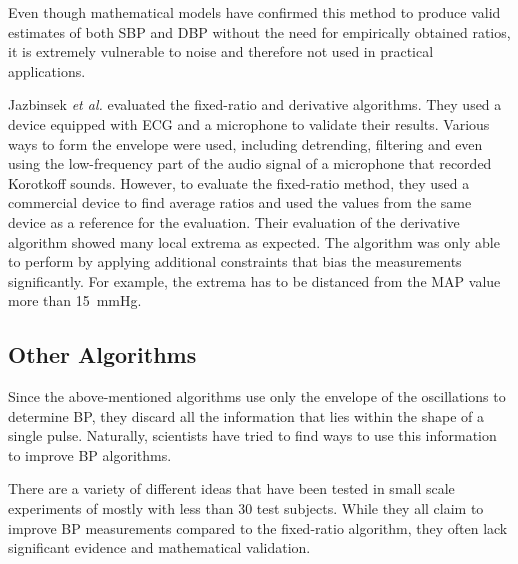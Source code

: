 Even though mathematical models have confirmed this method to produce valid estimates of both SBP and DBP without the need for empirically obtained ratios, it is extremely vulnerable to noise and therefore not used in practical applications.  \cite{Babbs2012,Chandrasekhar2019}

Jazbinsek \textit{et al.} evaluated the fixed-ratio and derivative algorithms. They used a device equipped with ECG and a microphone to validate their results. Various ways to form the envelope were used, including detrending, filtering and even using the low-frequency part of the audio signal of a microphone that recorded Korotkoff sounds. However, to evaluate the fixed-ratio method, they used a commercial device to find average ratios and used the values from the same device as a reference for the evaluation. Their evaluation of the derivative algorithm showed many local extrema as expected. The algorithm was only able to perform by applying additional constraints that bias the measurements significantly. For example, the extrema has to be distanced from the MAP value more than \SI{15}{\mmHg}. \cite{Jazbinsek2010,Jazbinsek2005,Jazbinsek2016}


\subsection{Other Algorithms}
Since the above-mentioned algorithms use only the envelope of the oscillations to determine BP, they discard all the information that lies within the shape of a single pulse. Naturally, scientists have tried to find ways to use this information to improve BP algorithms.

There are a variety of different ideas that have been tested in small scale experiments of mostly with less than 30 test subjects. While they all claim to improve BP measurements compared to the fixed-ratio algorithm, they often lack significant evidence and mathematical validation.


